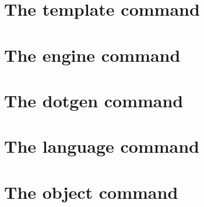 %
%
%
%
%
\section{The template command}


\section{The engine command}


\section{The dotgen command}


\section{The language command}


\section{The object command}

